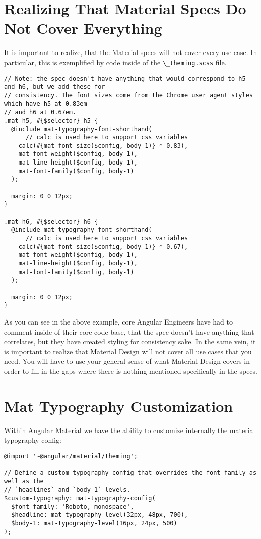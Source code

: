 \section{Realizing That Material Specs Do Not Cover Everything}
It is important to realize, that the Material specs will not cover
every use case. In particular, this is exemplified by code inside of 
the \lstinline{\_theming.scss} file. 

\begin{lstlisting}
// Note: the spec doesn't have anything that would correspond to h5 and h6, but we add these for
// consistency. The font sizes come from the Chrome user agent styles which have h5 at 0.83em
// and h6 at 0.67em.
.mat-h5, #{$selector} h5 {
  @include mat-typography-font-shorthand(
      // calc is used here to support css variables
    calc(#{mat-font-size($config, body-1)} * 0.83),
    mat-font-weight($config, body-1),
    mat-line-height($config, body-1),
    mat-font-family($config, body-1)
  );

  margin: 0 0 12px;
}

.mat-h6, #{$selector} h6 {
  @include mat-typography-font-shorthand(
      // calc is used here to support css variables
    calc(#{mat-font-size($config, body-1)} * 0.67),
    mat-font-weight($config, body-1),
    mat-line-height($config, body-1),
    mat-font-family($config, body-1)
  );

  margin: 0 0 12px;
}
\end{lstlisting}

As you can see in the above example, core Angular Engineers have had to comment 
inside of their core code base, that the spec doesn't have anything that 
correlates, but they have created styling for consistency sake. In the same vein,
it is important to realize that Material Design will not cover all use cases 
that you need. You will have to use your general sense of what Material Design 
covers in order to fill in the gaps where there is nothing mentioned specifically 
in the specs. 

\section{Mat Typography Customization}
Within Angular Material we have the ability to customize internally the 
material typography config: 

\begin{lstlisting}
@import '~@angular/material/theming';

// Define a custom typography config that overrides the font-family as well as the
// `headlines` and `body-1` levels.
$custom-typography: mat-typography-config(
  $font-family: 'Roboto, monospace',
  $headline: mat-typography-level(32px, 48px, 700),
  $body-1: mat-typography-level(16px, 24px, 500)
);
\end{lstlisting}

